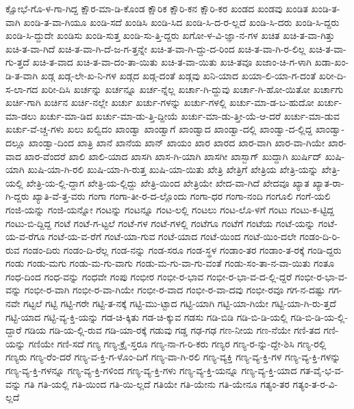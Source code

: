 {ಕ್ಷೋಭೆ-ಗೊ-ಳ-ಗಾ-ಗಿದ್ದ
ಕ್ಷೌರ-ಮಾ-ಡಿ-ಕೊಂಡ
ಕ್ಷೌರಿಕ
ಕ್ಷೌರಿ-ಕನ
ಕ್ಷೌರಿ-ಕರ
ಖಂಡದ
ಖಂಡವು
ಖಂಡಿತ
ಖಂಡಿ-ತ-ವಾಗಿ
ಖಂಡಿ-ತ-ವಾ-ಗಿಯೂ
ಖಂಡಿ-ಸದೆ
ಖಂಡಿಸಿ
ಖಂಡಿ-ಸಿದ
ಖಂಡಿ-ಸಿ-ದ-ರ-ಲ್ಲದೆ
ಖಂಡಿ-ಸಿ-ದರು
ಖಂಡಿ-ಸಿ-ದ್ದರು
ಖಂಡಿ-ಸಿ-ದ್ದುದೇ
ಖಂಡಿಸು
ಖಂಡಿ-ಸುತ್ತ
ಖಂಡಿ-ಸು-ತ್ತಿ-ದ್ದರು
ಖಗೋ-ಳ-ವಿ-ಜ್ಞಾ-ನ-ಗಳ
ಖಚಿತ
ಖಚಿ-ತ-ವಾ-ಗಿತ್ತು
ಖಚಿ-ತ-ವಾ-ಗಿದೆ
ಖಚಿ-ತ-ವಾ-ಗಿ-ದೆ-ಜ-ಗ-ತ್ತನ್ನೇ
ಖಚಿ-ತ-ವಾ-ಗಿ-ದ್ದು-ದ-ರಿಂದ
ಖಚಿ-ತ-ವಾ-ಗಿ-ರ-ಲಿಲ್ಲ
ಖಚಿ-ತ-ವಾ-ಗು-ತ್ತದೆ
ಖಚಿ-ತ-ವಾದ
ಖಚಿ-ತ-ವಾ-ದಂ-ತಾ-ಯಿತು
ಖಚಿ-ತ-ವಾ-ಯಿತು
ಖಚಿ-ತವೂ
ಖಜಾಂ-ಚಿ-ಗ-ಳಾಗಿ
ಖಡಾ-ಖಂ-ಡಿ-ತ-ವಾಗಿ
ಖಡ್ಗ
ಖಡ್ಗ-ಲೇ-ಖ-ನಿ-ಗಳ
ಖಡ್ಗದ
ಖಡ್ಗ-ದಂತೆ
ಖಡ್ಗವು
ಖನಿ-ಯಾದ
ಖಯಾ-ಲಿ-ಯಾ-ಗ-ದಂತೆ
ಖರೀ-ದಿ-ಸ-ಲಾ-ಗದ
ಖರೀ-ದಿಸಿ
ಖರ್ಚನ್ನು
ಖರ್ಚನ್ನೂ
ಖರ್ಚ-ನ್ನೆಲ್ಲ
ಖರ್ಚಾ-ಗಿ-ದ್ದುವು
ಖರ್ಚಾ-ಗಿ-ಹೋ-ಯಿತೋ
ಖರ್ಚಾಗು
ಖರ್ಚಿ-ಗಾಗಿ
ಖರ್ಚಿನ
ಖರ್ಚಿ-ನಲ್ಲೇ
ಖರ್ಚು
ಖರ್ಚು-ಗಳನ್ನು
ಖರ್ಚು-ಗಳಲ್ಲಿ
ಖರ್ಚು-ಮಾ-ಡ-ಬ-ಹುದೋ
ಖರ್ಚು-ಮಾ-ಡಲು
ಖರ್ಚು-ಮಾ-ಡಿದ
ಖರ್ಚು-ಮಾ-ಡು-ತ್ತಿ-ದ್ದೀಯೆ
ಖರ್ಚು-ಮಾ-ಡು-ತ್ತೀ-ಯೆ-ಆ-ದರೆ
ಖರ್ಚು-ಮಾ-ಡುವ
ಖರ್ಚು-ವೆ-ಚ್ಚ-ಗಳು
ಖಲು
ಖಲ್ವಿದಂ
ಖಾಂಡ್ವಾ
ಖಾಂಡ್ವಾಗೆ
ಖಾಂಡ್ವಾದ
ಖಾಂಡ್ವಾ-ದಲ್ಲಿ
ಖಾಂಡ್ವಾ-ದ-ಲ್ಲಿದ್ದ
ಖಾಂಡ್ವಾ-ದಲ್ಲೂ
ಖಾಂಡ್ವಾ-ದಿಂದ
ಖಾತ್ರಿ
ಖಾನೆ
ಖಾನೆಯ
ಖಾನ್
ಖಾಯಂ
ಖಾರ
ಖಾರದ
ಖಾರ-ವಾಗಿ
ಖಾರ-ವಾ-ಗಿಯೇ
ಖಾರ-ವಾದ
ಖಾರ-ವೆಂದರೆ
ಖಾಲಿ
ಖಾಲಿ-ಯಾದ
ಖಾಸಗಿ
ಖಾಸ-ಗಿ-ಯಾಗಿ
ಖಾಸಗೀ
ಖಾಸ್ಬಾಗ್
ಖುದ್ದಾಗಿ
ಖುರ್ಷಿದ್
ಖುಷಿ-ಯಾಗಿ
ಖುಷಿ-ಯಾ-ಗಿ-ರಲಿ
ಖುಷಿ-ಯಾ-ಗಿ-ರುತ್ತ
ಖುಷಿ-ಯಾ-ಯಿತು
ಖೇತ್ರಿ
ಖೇತ್ರಿಗೆ
ಖೇತ್ರಿಯ
ಖೇತ್ರಿ-ಯನ್ನು
ಖೇತ್ರಿ-ಯಲ್ಲಿ
ಖೇತ್ರಿ-ಯ-ಲ್ಲಿ-ದ್ದಾಗ
ಖೇತ್ರಿ-ಯ-ಲ್ಲಿದ್ದು
ಖೇತ್ರಿ-ಯಿಂದ
ಖೇತ್ರಿಯೇ
ಖೇದ-ವಾ-ಗಿದೆ
ಖೇದವೂ
ಖ್ಯಾತ
ಖ್ಯಾತ-ರಾ-ಗಿ-ದ್ದರು
ಖ್ಯಾತಿ-ವೆ-ತ್ತ-ವರು
ಗಂಗಾ
ಗಂಗಾ-ತೀ-ರ-ದ-ಲ್ಲೊಂದು
ಗಂಗಾ-ಧರ
ಗಂಗಾ-ನಂದಿ
ಗಂಗೂಲಿ
ಗಂಗೆ-ಯಲಿ
ಗಂಜಿ-ಯನ್ನು
ಗಂಜಿ-ಯನ್ನೋ
ಗಂಟನ್ನು
ಗಂಟನ್ನೂ
ಗಂಟ-ಲಲ್ಲಿ
ಗಂಟಲು
ಗಂಟ-ಲೊ-ಳಗೆ
ಗಂಟು
ಗಂಟು-ಕ-ಟ್ಟಿದ್ದ
ಗಂಟು-ಬಿ-ದ್ದಿದ್ದ
ಗಂಟೆ
ಗಂಟೆ-ಗ-ಟ್ಟಲೆ
ಗಂಟೆ-ಗಳ
ಗಂಟೆ-ಗಳಲ್ಲಿ
ಗಂಟೆಗೂ
ಗಂಟೆಗೆ
ಗಂಟೆಯ
ಗಂಟೆ-ಯನ್ನು
ಗಂಟೆ-ಯ-ವ-ರೆಗೂ
ಗಂಟೆ-ಯ-ವ-ರೆಗೆ
ಗಂಟೆ-ಯಾ-ಗುವ
ಗಂಟೆ-ಯಾದ
ಗಂಟೆ-ಯಿಂದ
ಗಂಟೆ-ಯಿಂ-ದಲೇ
ಗಂಡಂ-ದಿ-ರಿ-ರುವ
ಗಂಡಂ-ದಿರು
ಗಂಡಂ-ದಿ-ರೆಲ್ಲ
ಗಂಡ-ನನ್ನು
ಗಂಡ-ಸರೂ
ಗಂಡ-ಸ್ಥಳ
ಗಂಡಾಂ-ತರ
ಗಂಡಾಂ-ತ-ರಕ್ಕೆ
ಗಂಡಿ-ದ್ದರು
ಗಂಡು
ಗಂಡು-ಮಗು
ಗಂಡು-ಮ-ಗು-ವಾಗು
ಗಂಡು-ಮ-ಗು-ವಾ-ಗು-ವಂತೆ
ಗಂಡು-ಸಂ-ತಾ-ನ-ವಾ-ಯಿತು
ಗಂತೂ
ಗಂಧ-ದಿಂದ
ಗಂಧ-ವನ್ನು
ಗಂಧವೇ
ಗಂಪು
ಗಂಭೀರ
ಗಂಭೀ-ರ-ಭಾವ
ಗಂಭೀ-ರ-ಭಾ-ವ-ದ-ಲ್ಲಿ-ದ್ದರೆ
ಗಂಭೀ-ರ-ಭಾ-ವ-ವನ್ನು
ಗಂಭೀ-ರ-ವಾಗಿ
ಗಂಭೀ-ರ-ವಾ-ಗಿಯೇ
ಗಂಭೀ-ರ-ವಾದ
ಗಂಭೀ-ರ-ವಾ-ದವು
ಗಂಭೀ-ರವೂ
ಗಗ-ನ-ದಷ್ಟು
ಗಗ-ನವೇ
ಗಟ್ಟಲೆ
ಗಟ್ಟಿ
ಗಟ್ಟಿ-ಗರೇ
ಗಟ್ಟಿ-ತ-ನಕ್ಕೆ
ಗಟ್ಟಿ-ಮು-ಟ್ಟಾದ
ಗಟ್ಟಿ-ಯಾಗಿ
ಗಟ್ಟಿ-ಯಾ-ಗಿಯೇ
ಗಟ್ಟಿ-ಯಾ-ಗಿ-ರು-ತ್ತದೆ
ಗಟ್ಟಿ-ಯಾದ
ಗಟ್ಟಿ-ವ್ಯ-ಕ್ತಿ-ಯನ್ನು
ಗಡ-ಚಿ-ಕ್ಕಿತು
ಗಡ-ಚಿ-ಕ್ಕುವ
ಗಡಸು
ಗಡಿ-ಬಿಡಿ
ಗಡಿ-ಬಿ-ಡಿ-ಯಲ್ಲಿ
ಗಡಿ-ಬಿ-ಡಿ-ಯ-ಲ್ಲಿ-ದ್ದಾರೆ
ಗಡಿಯ
ಗಡಿ-ಯ-ಲ್ಲಿ-ರುವ
ಗಡಿ-ಯಾ-ರಕ್ಕೆ
ಗಡುವು
ಗಡ್ಡ
ಗಢ-ಗಢ
ಗಣ-ನೀಯ
ಗಣ-ನೆಯೇ
ಗಣಿ-ತದ
ಗಣಿ-ಯನ್ನು
ಗಣಿಯೇ
ಗಣಿ-ಸದೆ
ಗಣ್ಯ
ಗಣ್ಯ-ಕ್ರೈ-ಸ್ತರೂ
ಗಣ್ಯ-ನಾ-ಗ-ರಿ-ಕರು
ಗಣ್ಯರ
ಗಣ್ಯ-ರ-ನ್ನು-ದ್ದೇ-ಶಿಸಿ
ಗಣ್ಯ-ರಲ್ಲಿ
ಗಣ್ಯರು
ಗಣ್ಯ-ರೆಂ-ದರೆ
ಗಣ್ಯ-ವ-ಕ್ತಿ-ಗ-ಳೊಂ-ದಿಗೆ
ಗಣ್ಯ-ವಾ-ಗಿ-ರಲಿ
ಗಣ್ಯ-ವ್ಯಕ್ತಿ
ಗಣ್ಯ-ವ್ಯ-ಕ್ತಿ-ಗಳ
ಗಣ್ಯ-ವ್ಯ-ಕ್ತಿ-ಗಳನ್ನು
ಗಣ್ಯ-ವ್ಯ-ಕ್ತಿ-ಗಳನ್ನೂ
ಗಣ್ಯ-ವ್ಯ-ಕ್ತಿ-ಗಳಿಂದ
ಗಣ್ಯ-ವ್ಯ-ಕ್ತಿ-ಗಳು
ಗಣ್ಯ-ವ್ಯ-ಕ್ತಿ-ಯನ್ನೂ
ಗಣ್ಯ-ವ್ಯ-ಕ್ತಿ-ಯಾದ
ಗತ-ವೈ-ಭ-ವ-ವನ್ನು
ಗತಿ
ಗತಿ-ಯಲ್ಲಿ
ಗತಿ-ಯಿಂದ
ಗತಿ-ಯಿ-ಲ್ಲದೆ
ಗತಿಯೇ
ಗತಿ-ಯೇನು
ಗತಿ-ಯೇನೂ
ಗತ್ಯಂ-ತರ
ಗತ್ಯಂ-ತ-ರ-ವಿ-ಲ್ಲದೆ
}
